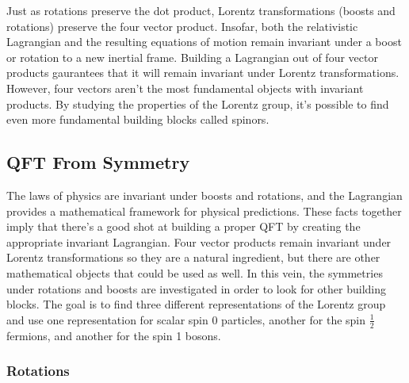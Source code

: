Just as rotations preserve the dot product, Lorentz transformations (boosts and rotations) preserve the four vector product. Insofar, both the relativistic Lagrangian and the resulting equations of motion remain invariant under a boost or rotation to a new inertial frame. Building a Lagrangian out of four vector products gaurantees that it will remain invariant under Lorentz transformations. However, four vectors aren't the most fundamental objects with invariant products. By studying the properties of the Lorentz group, it's possible to find even more fundamental building blocks called spinors.

\subsection{QFT From Symmetry}

The laws of physics are invariant under boosts and rotations, and the Lagrangian provides a mathematical framework for physical predictions. These facts together imply that there's a good shot at building a proper QFT by creating the appropriate invariant Lagrangian. Four vector products remain invariant under Lorentz transformations so they are a natural ingredient, but there are other mathematical objects that could be used as well. In this vein, the symmetries under rotations and boosts are investigated in order to look for other building blocks. The goal is to find three different representations of the Lorentz group and use one representation for scalar spin 0 particles, another for the spin $\frac{1}{2}$ fermions, and another for the spin 1 bosons.

\subsubsection{Rotations}

